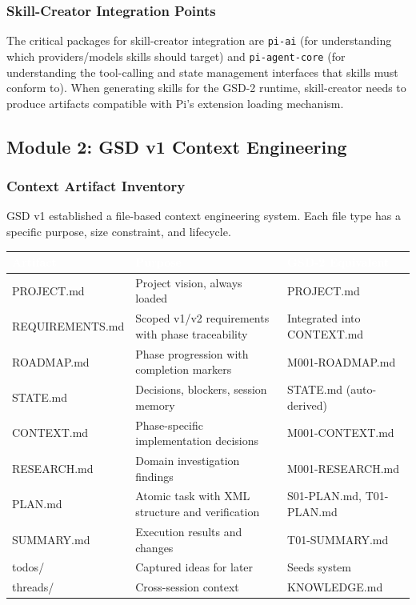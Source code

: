 \documentclass[11pt,letterpaper]{article}
\newcommand{\tableheader}[1]{\textbf{\sffamily\textcolor{white}{#1}}}
\begin{document}
\subsubsection{Skill-Creator Integration Points}

The critical packages for skill-creator integration are \texttt{pi-ai} (for understanding which providers/models skills should target) and \texttt{pi-agent-core} (for understanding the tool-calling and state management interfaces that skills must conform to). When generating skills for the GSD-2 runtime, skill-creator needs to produce artifacts compatible with Pi's extension loading mechanism.

\subsection{Module 2: GSD v1 Context Engineering}

\subsubsection{Context Artifact Inventory}

GSD v1 established a file-based context engineering system. Each file type has a specific purpose, size constraint, and lifecycle.

\begin{center}
\begin{tabularx}{\textwidth}{L{3cm}XL{2.5cm}}
\toprule
{}
\tableheader{Artifact} & \tableheader{Purpose} & \tableheader{GSD-2 Equivalent} \\
\midrule
PROJECT.md & Project vision, always loaded & PROJECT.md \\
REQUIREMENTS.md & Scoped v1/v2 requirements with phase traceability & Integrated into CONTEXT.md \\
ROADMAP.md & Phase progression with completion markers & M001-ROADMAP.md \\
STATE.md & Decisions, blockers, session memory & STATE.md (auto-derived) \\
CONTEXT.md & Phase-specific implementation decisions & M001-CONTEXT.md \\
RESEARCH.md & Domain investigation findings & M001-RESEARCH.md \\
PLAN.md & Atomic task with XML structure and verification & S01-PLAN.md, T01-PLAN.md \\
SUMMARY.md & Execution results and changes & T01-SUMMARY.md \\
todos/ & Captured ideas for later & Seeds system \\
threads/ & Cross-session context & KNOWLEDGE.md \\
\bottomrule
\end{tabularx}
\end{center}
\end{document}
